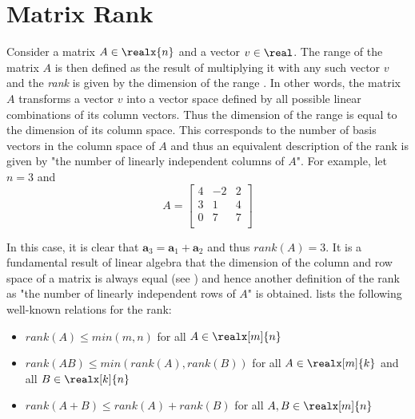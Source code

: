 \section{Matrix Rank}
\label{sec:matrix_rank}

Consider a matrix $A \in \realx{n}$ and a vector $v \in \real$. The range of the matrix $A$ is then defined as the result of multiplying it with any such vector $v$ and the \textit{rank} is given by the dimension of the range \cite{bebendorf_hierarchical_2008}. In other words, the matrix $A$ transforms a vector $v$ into a vector space defined by all possible linear combinations of its column vectors. Thus the dimension of the range is equal to the dimension of its column space. This corresponds to the number of basis vectors in the column space of $A$ and thus an equivalent description of the rank is given by "the number of linearly independent columns of $A$". For example, let $n=3$ and
\begin{equation}
\label{eqn:low_rank}
 A= \left[
    \begin{array}{ccc}
      4 & -2 & 2 \\
      3 & 1 & 4  \\
      0 & 7 & 7  \\
    \end{array}
  \right]
\end{equation}

\noindent In this case, it is clear that $\bm{a}_3=\bm{a}_1+\bm{a}_2$ and thus $rank(A)=3$. It is a fundamental result of linear algebra that the dimension of the column and row space of a matrix is always equal (see \cite{strang_introduction_2009}) and hence another definition of the rank as "the number of linearly independent rows of $A$" is obtained. \cite{bebendorf_hierarchical_2008} lists the following well-known relations for the rank:
\begin{itemize}
    \item $rank(A) \leq min(m,n)$ for all $A \in \realx[m]{n}$
    \item $rank(AB) \leq min(rank(A), rank(B))$ for all $A \in \realx[m]{k}$ and all $B \in \realx[k]{n}$
    \item $rank(A+B) \leq rank(A)+rank(B)$ for all $A,B \in \realx[m]{n}$
\end{itemize}

